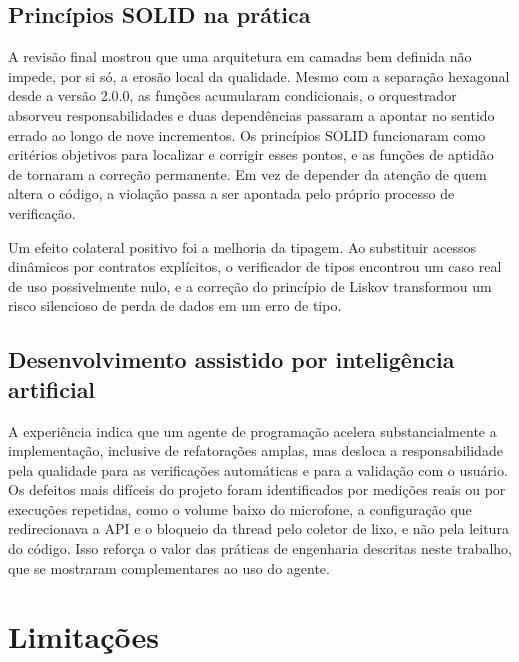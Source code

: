 \subsection{Princípios SOLID na prática}

A revisão final mostrou que uma arquitetura em camadas bem definida não impede, por si só, a erosão
local da qualidade. Mesmo com a separação hexagonal desde a versão 2.0.0, as funções acumularam
condicionais, o orquestrador absorveu responsabilidades e duas dependências passaram a apontar no
sentido errado ao longo de nove incrementos. Os princípios SOLID funcionaram como critérios objetivos
para localizar e corrigir esses pontos, e as funções de aptidão de \textcite{ford2017} tornaram a
correção permanente. Em vez de depender da atenção de quem altera o código, a violação passa a ser
apontada pelo próprio processo de verificação.

Um efeito colateral positivo foi a melhoria da tipagem. Ao substituir acessos dinâmicos por contratos
explícitos, o verificador de tipos encontrou um caso real de uso possivelmente nulo, e a correção do
princípio de Liskov transformou um risco silencioso de perda de dados em um erro de tipo.

\subsection{Desenvolvimento assistido por inteligência artificial}

A experiência indica que um agente de programação acelera substancialmente a implementação, inclusive
de refatorações amplas, mas desloca a responsabilidade pela qualidade para as verificações automáticas
e para a validação com o usuário. Os defeitos mais difíceis do projeto foram identificados por medições
reais ou por execuções repetidas, como o volume baixo do microfone, a configuração que redirecionava a
API e o bloqueio da thread pelo coletor de lixo, e não pela leitura do código. Isso reforça o valor das
práticas de engenharia descritas neste trabalho, que se mostraram complementares ao uso do agente.

\section{Limitações}

